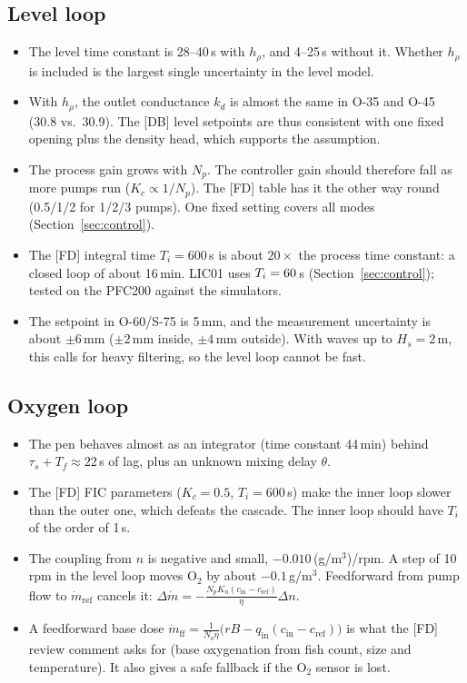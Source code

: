 \documentclass[11pt]{article}
\begin{document}
\subsection{Level loop}
\begin{itemize}
  \item The level time constant is 28--40\,s with $h_\rho$, and 4--25\,s without it. Whether
        $h_\rho$ is included is the largest single uncertainty in the level model.
  \item With $h_\rho$, the outlet conductance $k_d$ is almost the same in O-35 and O-45
        (30.8 vs.\ 30.9). The [DB] level setpoints are thus consistent with one fixed opening
        plus the density head, which supports the assumption.
  \item The process gain grows with $N_p$. The controller gain should therefore fall as more
        pumps run ($K_c\propto 1/N_p$). The [FD] table has it the other way round
        (0.5/1/2 for 1/2/3 pumps). One fixed setting covers all modes
        (Section~\ref{sec:control}).
  \item The [FD] integral time $T_i = 600$\,s is about $20\times$ the process time constant: a
        closed loop of about 16\,min. LIC01 uses $T_i = 60$\,s
        (Section~\ref{sec:control}); tested on the PFC200 against the simulators.
  \item The setpoint in O-60/S-75 is 5\,mm, and the measurement uncertainty is about
        $\pm 6$\,mm ($\pm2$\,mm inside, $\pm4$\,mm outside). With waves up to $H_s = 2$\,m,
        this calls for heavy filtering, so the level loop cannot be fast.
\end{itemize}

\subsection{Oxygen loop}
\begin{itemize}
  \item The pen behaves almost as an integrator (time constant 44\,min) behind
        $\tau_s+T_f\approx 22$\,s of lag, plus an unknown mixing delay $\theta$.
  \item The [FD] FIC parameters ($K_c=0.5$, $T_i=600$\,s) make the inner loop slower than the
        outer one, which defeats the cascade. The inner loop should have $T_i$ of the order of
        1\,s.
  \item The coupling from $n$ is negative and small, $-0.010$\,(g/m$^3$)/rpm. A step of 10\,rpm in
        the level loop moves O$_2$ by about $-0.1$\,g/m$^3$. Feedforward from pump flow to
        $\dot m_\text{ref}$ cancels it: $\Delta\dot m = -\frac{N_pK_n(c_\text{in}-c_\text{ref})}{\eta}\Delta n$.
  \item A feedforward base dose
        $\dot m_\text{ff} = \frac{1}{N_o\eta}\big(rB - q_\text{in}(c_\text{in}-c_\text{ref})\big)$
        is what the [FD] review comment asks for (base oxygenation from fish count, size and
        temperature). It also gives a safe fallback if the O$_2$ sensor is lost.
\end{itemize}
\end{document}
